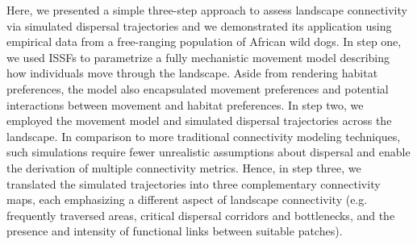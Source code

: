 \documentclass[abstract=on,10pt,a4paper,bibliography=totocnumbered]{article}
\begin{document}
Here, we presented a simple three-step approach to assess landscape connectivity
via simulated dispersal trajectories and we demonstrated its application using
empirical data from a free-ranging population of African wild dogs. In step one,
we used ISSFs to parametrize a fully mechanistic movement model describing how
individuals move through the landscape. Aside from rendering habitat
preferences, the model also encapsulated movement preferences and potential
interactions between movement and habitat preferences. In step two, we employed
the movement model and simulated dispersal trajectories across the landscape. In
comparison to more traditional connectivity modeling techniques, such
simulations require fewer unrealistic assumptions about dispersal and enable the
derivation of multiple connectivity metrics. Hence, in step three, we translated
the simulated trajectories into three complementary connectivity maps, each
emphasizing a different aspect of landscape connectivity (e.g. frequently
traversed areas, critical dispersal corridors and bottlenecks, and the presence
and intensity of functional links between suitable patches).
\end{document}
